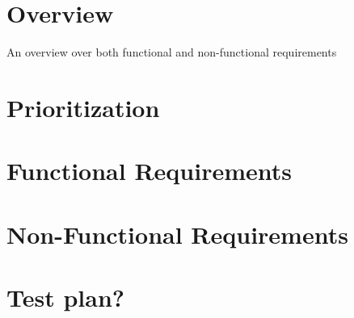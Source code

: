 
\chapter{Overview}
An overview over both functional and non-functional requirements

\chapter{Prioritization}

\chapter{Functional Requirements}

\chapter{Non-Functional Requirements}

\chapter{Test plan?}


